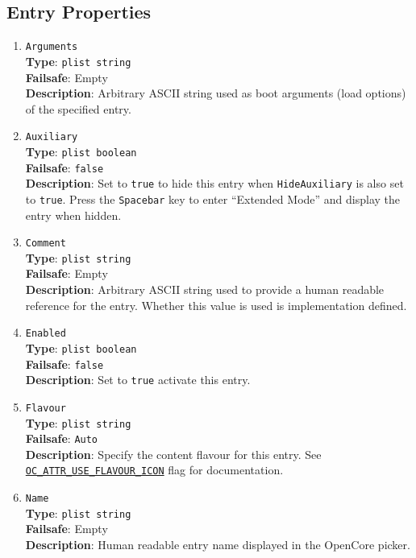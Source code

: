 \documentclass[]{article}
\begin{document}
\subsection{Entry Properties}\label{miscentryprops}

\begin{enumerate}
\item
  \texttt{Arguments}\\
  \textbf{Type}: \texttt{plist\ string}\\
  \textbf{Failsafe}: Empty\\
  \textbf{Description}: Arbitrary ASCII string used as boot arguments (load options)
  of the specified entry.

\item
  \texttt{Auxiliary}\\
  \textbf{Type}: \texttt{plist\ boolean}\\
  \textbf{Failsafe}: \texttt{false}\\
  \textbf{Description}: Set to \texttt{true} to hide this entry
  when \texttt{HideAuxiliary} is also set to \texttt{true}.
  Press the \texttt{Spacebar} key to enter ``Extended Mode'' and display the entry when hidden.

\item
  \texttt{Comment}\\
  \textbf{Type}: \texttt{plist\ string}\\
  \textbf{Failsafe}: Empty\\
  \textbf{Description}: Arbitrary ASCII string used to provide a human readable
  reference for the entry. Whether this value is used is implementation defined.

\item
  \texttt{Enabled}\\
  \textbf{Type}: \texttt{plist\ boolean}\\
  \textbf{Failsafe}: \texttt{false}\\
  \textbf{Description}: Set to \texttt{true} activate this entry.

\item
  \texttt{Flavour}\\
  \textbf{Type}: \texttt{plist\ string}\\
  \textbf{Failsafe}: \texttt{Auto}\\
  \textbf{Description}: Specify the content flavour for this entry.
  See \hyperref[oc-attr-use-flavour-icon]{\texttt{OC\_ATTR\_USE\_FLAVOUR\_ICON}} flag for documentation.

\item
  \texttt{Name}\\
  \textbf{Type}: \texttt{plist\ string}\\
  \textbf{Failsafe}: Empty\\
  \textbf{Description}: Human readable entry name displayed in the OpenCore picker.


\end{enumerate}
\end{document}
